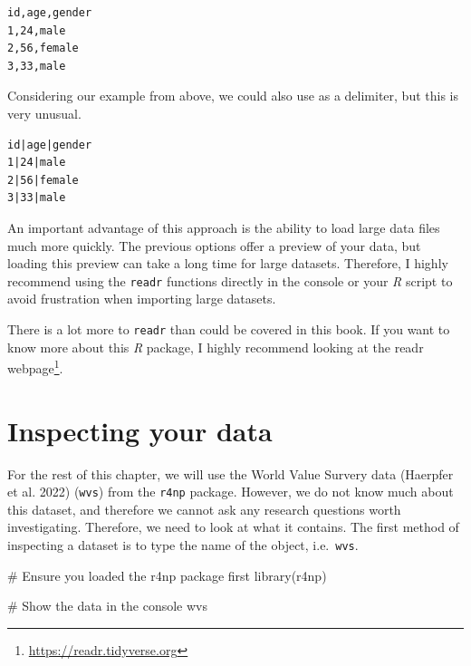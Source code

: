 \documentclass[
  letterpaper,
]{krantz}
\makeatletter
\newenvironment{Shaded}{\begin{snugshade}}{\end{snugshade}}
\newcommand{\CommentTok}[1]{\textcolor[rgb]{0.37,0.37,0.37}{#1}}
\newcommand{\FunctionTok}[1]{\textcolor[rgb]{0.28,0.35,0.67}{#1}}
\newcommand{\NormalTok}[1]{\textcolor[rgb]{0.00,0.23,0.31}{#1}}
\renewcommand{\href}[2]{#2\footnote{\url{#1}}}
\newenvironment{kframe}{%
\medskip{}
\setlength{\fboxsep}{.8em}
 \def\at@end@of@kframe{}%
 \ifinner\ifhmode%
  \def\at@end@of@kframe{\end{minipage}}%
  \begin{minipage}{\columnwidth}%
 \fi\fi%
 \def\FrameCommand##1{\hskip\@totalleftmargin \hskip-\fboxsep
 \colorbox{shadecolor}{##1}\hskip-\fboxsep
     \hskip-\linewidth \hskip-\@totalleftmargin \hskip\columnwidth}%
 \MakeFramed {\advance\hsize-\width
   \@totalleftmargin\z@ \linewidth\hsize
   \@setminipage}}%
 {\par\unskip\endMakeFramed%
 \at@end@of@kframe}
\renewenvironment{Shaded}{\begin{kframe}}{\end{kframe}}
\makeatother
\begin{document}
\begin{verbatim}
id,age,gender
1,24,male
2,56,female
3,33,male
\end{verbatim}

Considering our example from above, we could also use
\texttt{\textbar{}} as a delimiter, but this is very unusual.

\begin{verbatim}
id|age|gender
1|24|male
2|56|female
3|33|male
\end{verbatim}

An important advantage of this approach is the ability to load large
data files much more quickly. The previous options offer a preview of
your data, but loading this preview can take a long time for large
datasets. Therefore, I highly recommend using the \texttt{readr}
functions directly in the console or your \emph{R} script to avoid
frustration when importing large datasets.

There is a lot more to \texttt{readr} than could be covered in this
book. If you want to know more about this \emph{R} package, I highly
recommend looking at the \href{https://readr.tidyverse.org}{readr
webpage}.

\section{Inspecting your data}\label{sec-inspecting-raw-data}

For the rest of this chapter, we will use the World Value Survery data
(Haerpfer et al. 2022) (\texttt{wvs}) from the \texttt{r4np} package.
However, we do not know much about this dataset, and therefore we cannot
ask any research questions worth investigating. Therefore, we need to
look at what it contains. The first method of inspecting a dataset is to
type the name of the object, i.e.~\texttt{wvs}.

\begin{Shaded}
\begin{Highlighting}[]
\CommentTok{\# Ensure you loaded the \textquotesingle{}r4np\textquotesingle{} package first}
\FunctionTok{library}\NormalTok{(r4np)}

\CommentTok{\# Show the data in the console}
\NormalTok{wvs}
\end{Highlighting}
\end{Shaded}
\end{document}
